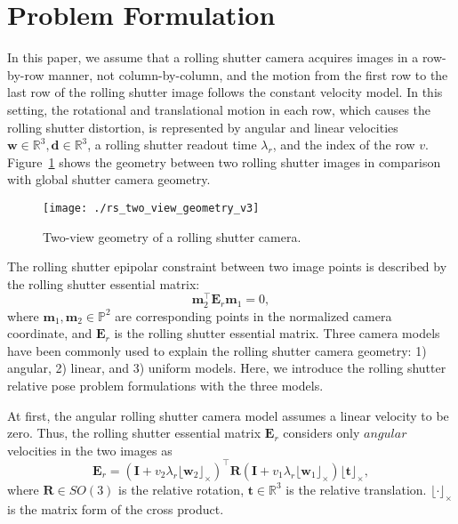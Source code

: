 \documentclass[10pt,twocolumn,letterpaper]{article}
\theoremstyle{definition}
\begin{document}
	\section{Problem Formulation} \label{sec:problem}
	
	
	In this paper, we assume that a rolling shutter camera acquires images in a row-by-row manner, not column-by-column, and the motion from the first row to the last row of the rolling shutter image follows the constant velocity model.
	In this setting, the rotational and translational motion in each row, which causes the rolling shutter distortion, is represented by angular and linear velocities $\mathbf{w} \in \mathbb{R}^{3},\mathbf{d} \in \mathbb{R}^{3}$, a rolling shutter readout time $\lambda_r$, and the index of the row $v$.
	Figure~\ref{fig:rs_two_view_geometry} shows the geometry between two rolling shutter images in comparison with global shutter camera geometry.
	
	\begin{figure}[tb]
		\centering	
		\texttt{[image: ./rs\_two\_view\_geometry\_v3]}	
		\caption{Two-view geometry of a rolling shutter camera. }		
		\label{fig:rs_two_view_geometry} 
	\end{figure}
	
	
	The rolling shutter epipolar constraint between two image points is described by the rolling shutter essential matrix:
	\begin{equation}
	\mathbf{m}_{2}^{\top} \mathbf{E}_{r} \mathbf{m}_{1} = 0 ,
	\label{eq:rolling_shutter_epipolar_geometry}
	\end{equation}
	where $\mathbf{m}_{1},\mathbf{m}_{2} \in \mathbb{P}^2$ are corresponding points in the normalized camera coordinate, and  $\mathbf{E}_{r}$ is the rolling shutter essential matrix.
	Three camera models have been commonly used to explain the rolling shutter camera geometry: 1) angular, 2) linear, and 3) uniform models.
	Here, we introduce the rolling shutter relative pose problem formulations with the three models.
	
	
	At first, the angular rolling shutter camera model assumes a linear velocity to be zero.
	Thus, the rolling shutter essential matrix $ \mathbf{E}_r $ considers only $\textit{angular}$ velocities in the two images as 
	\begin{equation}
	\mathbf{E}_{r} = \left(\mathbf{I} + v_2 \lambda_{r} \lfloor \mathbf{w}_2 \rfloor_{\times} \right)^{\top}  \mathbf{R} \left(\mathbf{I} + v_1 \lambda_{r} \lfloor \mathbf{w}_1 \rfloor_{\times} \right) \lfloor \mathbf{t} \rfloor_{\times} ,
	\end{equation}
	where $\mathbf{R} \in SO(3)$ is the relative rotation, $\mathbf{t} \in \mathbb{R}^{3}$ is the relative translation.
	$\lfloor \cdot \rfloor_{\times}$ is the matrix form of the cross product.
	
\end{document}
